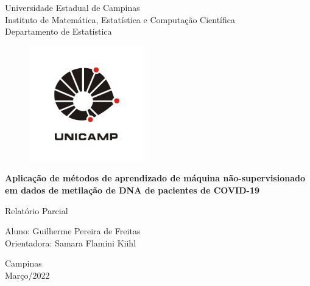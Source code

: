 \begin{titlepage}
    \begin{center}
        \vspace*{1cm}
        
        \LARGE
        Universidade Estadual de Campinas\\
        
        \large
        Instituto de Matemática, Estatística e Computação Científica\\
        Departamento de Estatística
        
        \vspace{0.5cm}

            
        \begin{figure}
		    \centering
		    \includegraphics[width=5cm]{unicamp-logo-0.png}\\
	    \end{figure}   
        
        \vspace{0.5cm}
        
        \Large
        \textbf{Aplicação de métodos de aprendizado de máquina não-supervisionado em dados de metilação de DNA de pacientes de COVID-19}
        
        \vspace{0.5cm}
        
        \large
        Relatório Parcial
        
        \vspace{2cm}
        
        \Large
        Aluno: Guilherme Pereira de Freitas\\
        Orientadora: Samara Flamini Kiihl
        
            
        \vfill
        
        \small
        Campinas\\
        Março/2022
            
        \vspace{0.8cm}
            

            
    \end{center}
\end{titlepage}
